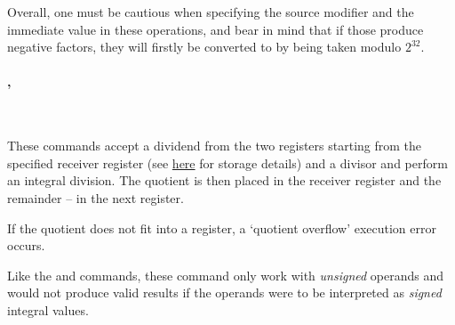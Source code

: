 Overall, one must be cautious when specifying the source modifier and the immediate value in these operations, and bear in mind that if those produce negative factors, they will firstly be converted to  by being taken modulo $2^{32}$.

\vspace{-0.35cm}

\paragraph{, }\

These commands accept a  dividend from the two registers starting from the specified receiver register (see \hyperlink{types:two_words_storage}{here} for storage details) and a  divisor and perform an integral division. The quotient is then placed in the receiver register and the remainder -- in the next register.

If the quotient does not fit into a register, a `quotient overflow' execution error occurs.

Like the  and  commands, these command only work with \textit{unsigned} operands and would not produce valid results if the operands were to be interpreted as \textit{signed} integral values.